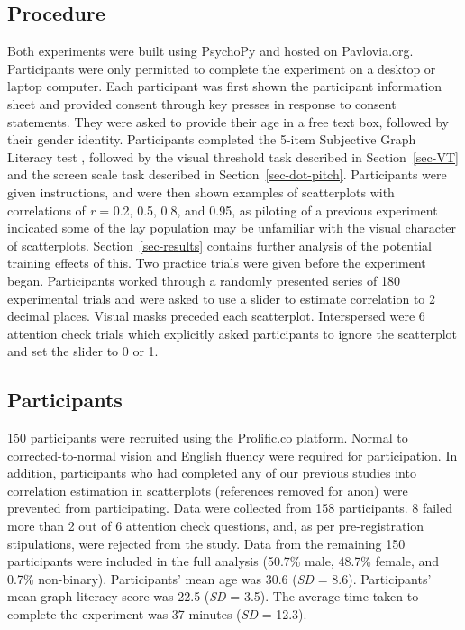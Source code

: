 \documentclass[manuscript, anonymous, screen]{acmart}
\begin{document}
\hypertarget{sec-gen-procedure}{%
\subsection{Procedure}\label{sec-gen-procedure}}

Both experiments were built using PsychoPy \citep{pierce_2019} and
hosted on Pavlovia.org. Participants were only permitted to complete the
experiment on a desktop or laptop computer. Each participant was first
shown the participant information sheet and provided consent through key
presses in response to consent statements. They were asked to provide
their age in a free text box, followed by their gender identity.
Participants completed the 5-item Subjective Graph Literacy test
\citep{garcia_2016}, followed by the visual threshold task described in
Section~\ref{sec-VT} and the screen scale task described in
Section~\ref{sec-dot-pitch}. Participants were given instructions, and
were then shown examples of scatterplots with correlations of \emph{r} =
0.2, 0.5, 0.8, and 0.95, as piloting of a previous experiment indicated
some of the lay population may be unfamiliar with the visual character
of scatterplots. Section~\ref{sec-results} contains further analysis of
the potential training effects of this. Two practice trials were given
before the experiment began. Participants worked through a randomly
presented series of 180 experimental trials and were asked to use a
slider to estimate correlation to 2 decimal places. Visual masks
preceded each scatterplot. Interspersed were 6 attention check trials
which explicitly asked participants to ignore the scatterplot and set
the slider to 0 or 1.

\hypertarget{sec-participants}{%
\subsection{Participants}\label{sec-participants}}

150 participants were recruited using the Prolific.co platform. Normal
to corrected-to-normal vision and English fluency were required for
participation. In addition, participants who had completed any of our
previous studies into correlation estimation in scatterplots (references
removed for anon) were prevented from participating. Data were collected
from 158 participants. 8 failed more than 2 out of 6 attention check
questions, and, as per pre-registration stipulations, were rejected from
the study. Data from the remaining 150 participants were included in the
full analysis (50.7\% male, 48.7\% female, and 0.7\% non-binary).
Participants' mean age was 30.6 (\emph{SD} = 8.6). Participants' mean
graph literacy score was 22.5 (\emph{SD} = 3.5). The average time taken
to complete the experiment was 37 minutes (\emph{SD} = 12.3).
\end{document}
